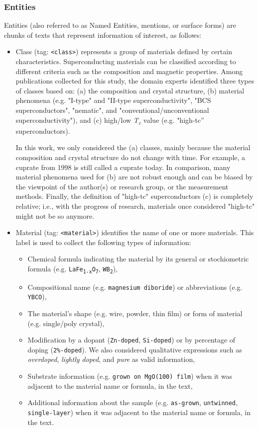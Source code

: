 \subsubsection{Entities}
Entities (also referred to as Named Entities, mentions, or surface forms) are chunks of texts that represent information of interest, as follows: 

\begin{itemize}
\item Class (tag: \texttt{<class>}) represents a group of materials defined by certain characteristics.
Superconducting materials can be classified according to different criteria such as the composition and magnetic properties. 
Among publications collected for this study, the domain experts identified three types of classes based on: (a) the composition and crystal structure, (b) material phenomena (e.g. "I-type" and "II-type superconductivity", "BCS superconductors", "nematic", and "conventional/unconventional superconductivity"), and (c) high/low \textit{T\textsubscript{c}} value (e.g. "high-tc” superconductors). 

In this work, we only considered the (a) classes, mainly because the material composition and crystal structure do not change with time. For example, a cuprate from 1998 is still called a cuprate today. 
In comparison, many material phenomena used for (b) are not robust enough and can be biased by the viewpoint of the author(s) or research group, or the measurement methods. 
Finally, the definition of "high-tc" superconductors (c) is completely relative; i.e., with the progress of research, materials once considered "high-tc" might not be so anymore.

\item Material (tag: \texttt{<material>}) identifies the name of one or more materials. 
This label is used to collect the following types of information: 
\begin{itemize}
    \item Chemical formula indicating the material by its general or stochiometric formula (e.g. \texttt{LaFe\textsubscript{1-x}O\textsubscript{7}}, \texttt{WB\textsubscript{2}}),
    \item Compositional name (e.g. \texttt{magnesium diboride}) or abbreviations (e.g. \texttt{YBCO}), 
    \item The material's shape (e.g. wire, powder, thin film) or form of material (e.g. single/poly crystal), 
    \item Modification by a dopant (\texttt{Zn-doped}, \texttt{Si-doped}) or by percentage of doping (\texttt{2\%-doped}). We also considered qualitative expressions such as \textit{overdoped}, \textit{lightly doped}, and \textit{pure} as valid information, 
    \item Substrate information (e.g. \texttt{grown on MgO(100) film}) when it was adjacent to the material name or formula, in the text,
    \item Additional information about the sample (e.g. \texttt{as-grown}, \texttt{untwinned}, \texttt{single-layer}) when it was adjacent to the material name or formula, in the text. 
\end{itemize}


\end{itemize}
